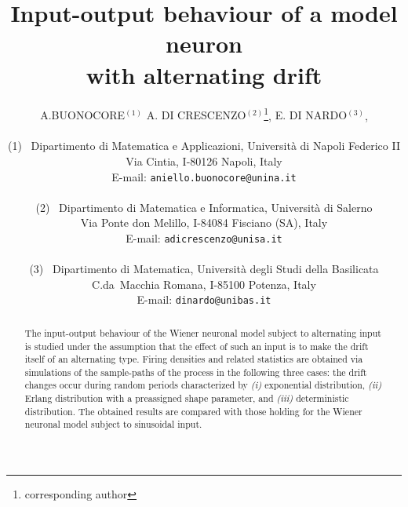 \title{\Large \bf
Input-output behaviour of a model neuron \\
with alternating drift
}
\author{
 {\sc \small{A.BUONOCORE$^{(1)}$}}
 {\sc  \small{A. DI CRESCENZO$^{(2)}$\footnote{corresponding author}}, }
 {\sc \small{E. DI NARDO$^{(3)}$}, }\\
 \\
 {\small \rm (1) \ Dipartimento di Matematica e Applicazioni, 
 Universit\`a di Napoli Federico II}\\
 {\small \rm Via Cintia, I-80126 Napoli, Italy}\\
 {\small\rm E-mail: \tt aniello.buonocore@unina.it}\\
 \\
 {\small \rm (2) \ Dipartimento di Matematica e Informatica,
 Universit\`a di Salerno} \\
 {\small \rm Via Ponte don Melillo, I-84084 Fisciano (SA), Italy} \\
 {\small \rm E-mail: \tt adicrescenzo@unisa.it}\\
 \\
 {\small \rm (3) \ Dipartimento di Matematica,
 Universit\`a degli Studi della Basilicata}\\
 {\small \rm C.da\ Macchia Romana, I-85100 Potenza, Italy}\\
 {\small \rm E-mail: \tt dinardo@unibas.it}\\
}
\date{}

\setlength{\baselineskip}{13pt}
%
%
\maketitle
\begin{abstract}
The input-output behaviour of the Wiener neuronal model subject to alternating
input is studied under the assumption that the effect of such an input is
to make the drift itself of an alternating type. Firing densities and related
statistics are obtained via simulations of the sample-paths of the process
in the following three cases: the drift changes occur during random periods 
characterized by {\em (i)} exponential distribution, {\em (ii)} Erlang 
distribution with a preassigned shape parameter, and {\em (iii)} deterministic 
distribution. The obtained results are compared with those holding 
for the Wiener neuronal model subject to sinusoidal input.
\end{abstract}

